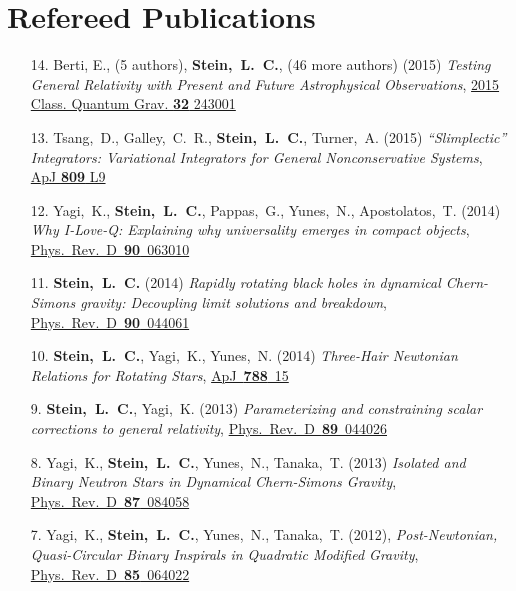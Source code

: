 \section{\sc Refereed Publications}
\begin{enumerate}
\item[{14.}] Berti, E., (5 authors), {\bf Stein,~L.~C.}, (46 more authors) (2015)
  {\it Testing General Relativity with Present and Future
    Astrophysical Observations},
  \href{http://dx.doi.org/10.1088/0264-9381/32/24/243001}{2015 Class. Quantum Grav. {\bf 32} 243001}
\item[{13.}] Tsang,~D., Galley,~C.~R., {\bf Stein,~L.~C.}, Turner,~A. (2015)
  {\it ``Slimplectic'' Integrators: Variational Integrators for General Nonconservative Systems},
  \href{http://dx.doi.org/10.1088/2041-8205/809/1/L9}{ApJ {\bf 809} L9}
\item[{12.}] Yagi,~K., {\bf Stein,~L.~C.}, Pappas,~G., Yunes,~N., Apostolatos,~T. (2014)
  {\it Why I-Love-Q: Explaining why universality emerges in compact objects},
  \href{http://dx.doi.org/10.1103/PhysRevD.90.063010}{Phys.~Rev.~D~{\bf 90}~063010}
\item[{11.}] {\bf Stein,~L.~C.} (2014)
  {\it Rapidly rotating black holes in dynamical Chern-Simons gravity:
    Decoupling limit solutions and breakdown},
  \href{http://dx.doi.org/10.1103/PhysRevD.90.044061}{Phys.~Rev.~D~{\bf 90}~044061}
\item[{10.}] {\bf Stein,~L.~C.}, Yagi,~K., Yunes,~N. (2014)
  {\it Three-Hair Newtonian Relations for Rotating Stars},
  \href{http://dx.doi.org/10.1088/0004-637X/788/1/15}{ApJ~{\bf 788}~15}
\item[{9.}] {\bf Stein,~L.~C.}, Yagi,~K. (2013)
  {\it Parameterizing and constraining scalar corrections to general relativity},
  \href{http://dx.doi.org/10.1103/PhysRevD.89.044026}{Phys.~Rev.~D~{\bf 89}~044026}
\item[{8.}] Yagi,~K., {\bf Stein,~L.~C.}, Yunes,~N., Tanaka,~T. (2013)
  {\it Isolated and Binary Neutron Stars in Dynamical Chern-Simons
    Gravity},
  \href{http://dx.doi.org/10.1103/PhysRevD.87.084058}{Phys.~Rev.~D~{\bf 87}~084058}
\item[{7.}] Yagi,~K., {\bf Stein,~L.~C.}, Yunes,~N.,
  Tanaka,~T. (2012), {\it Post-Newtonian, Quasi-Circular Binary
    Inspirals in Quadratic Modified Gravity},
  \href{http://dx.doi.org/10.1103/PhysRevD.85.064022}{Phys.~Rev.~D~{\bf 85}~064022}

\end{enumerate}
